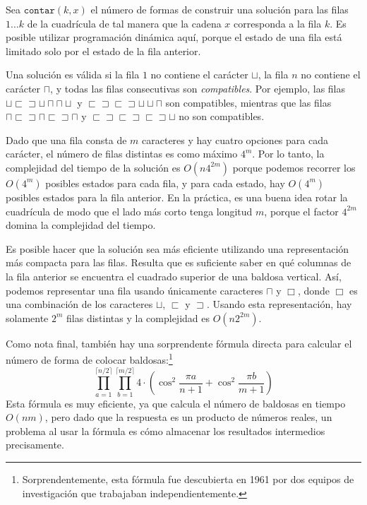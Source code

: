 Sea $\texttt{contar}(k,x)$ el número de formas de
construir una solución para las filas $1 \ldots k$
de la cuadrícula de tal manera que la cadena $x$ corresponda a la fila $k$.
Es posible utilizar programación dinámica aquí,
porque el estado de una fila está limitado
solo por el estado de la fila anterior.

Una solución es válida si la fila $1$ no contiene
el carácter $\sqcup$,
la fila $n$ no contiene el carácter $\sqcap$,
y todas las filas consecutivas son \emph{compatibles}.
Por ejemplo, las filas
$\sqcup \sqsubset \sqsupset \sqcup \sqcap \sqcap \sqcup$ y
$\sqsubset \sqsupset \sqsubset \sqsupset \sqcup \sqcup \sqcap$
son compatibles, mientras que las filas
$\sqcap \sqsubset \sqsupset \sqcap \sqsubset \sqsupset \sqcap$ y
$\sqsubset \sqsupset \sqsubset \sqsupset \sqsubset \sqsupset \sqcup$
no son compatibles.

Dado que una fila consta de $m$ caracteres y hay
cuatro opciones para cada carácter, el número de filas distintas
es como máximo $4^m$.
Por lo tanto, la complejidad del tiempo de la solución es
$O(n 4^{2m})$ porque podemos recorrer los
$O(4^m)$ posibles estados para cada fila,
y para cada estado, hay $O(4^m)$
posibles estados para la fila anterior.
En la práctica, es una buena idea rotar la cuadrícula
de modo que el lado más corto tenga longitud $m$,
porque el factor $4^{2m}$ domina la complejidad del tiempo.

Es posible hacer que la solución sea más eficiente
utilizando una representación más compacta para las filas.
Resulta que es suficiente saber en qué
columnas de la fila anterior se encuentra el cuadrado superior
de una baldosa vertical.
Así, podemos representar una fila usando únicamente caracteres
$\sqcap$ y $\Box$, donde $\Box$ es una combinación
de los caracteres
$\sqcup$, $\sqsubset$ y $\sqsupset$.
Usando esta representación, hay solamente
$2^m$ filas distintas y la complejidad es $O(n 2^{2m})$.

Como nota final, también hay una sorprendente fórmula directa
para calcular el número de forma de colocar baldosas:\footnote{Sorprendentemente,
    esta fórmula fue descubierta en 1961 por dos equipos de investigación \cite{kas61,tem61}
    que trabajaban independientemente.}
\[ \prod_{a=1}^{\lceil n/2 \rceil} \prod_{b=1}^{\lceil m/2 \rceil} 4 \cdot (\cos^2 \frac{\pi a}{n + 1} + \cos^2 \frac{\pi b}{m+1})\]
Esta fórmula es muy eficiente, ya que calcula
el número de baldosas en tiempo $O(nm)$,
pero dado que la respuesta es un producto de números reales,
un problema al usar la fórmula es
cómo almacenar los resultados intermedios precisamente.


